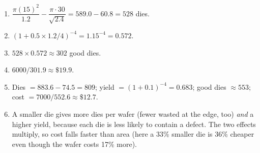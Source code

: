 \documentclass[11pt]{article}
\begin{document}
\begin{solution}[\ref{x:die}]
\leavevmode
\begin{enumerate}[label=(\alph*),leftmargin=*]
  \item $\dfrac{\pi(15)^2}{1.2} - \dfrac{\pi\cdot30}{\sqrt{2.4}} = 589.0 -
  60.8 = 528$ dies.
  \item $(1 + 0.5\times1.2/4)^{-4} = 1.15^{-4} = 0.572$.
  \item $528\times0.572 \approx 302$ good dies.
  \item $6000/301.9 \approx \$19.9$.
  \item Dies $= 883.6 - 74.5 = 809$; yield $= (1+0.1)^{-4} = 0.683$; good dies
  $\approx 553$; cost $= 7000/552.6 \approx \$12.7$.
  \item A smaller die gives more dies per wafer (fewer wasted at the edge, too)
  \emph{and} a higher yield, because each die is less likely to contain a
  defect. The two effects multiply, so cost falls faster than area (here a
  33\% smaller die is 36\% cheaper even though the wafer costs 17\% more).
\end{enumerate}
\end{solution}
\end{document}
